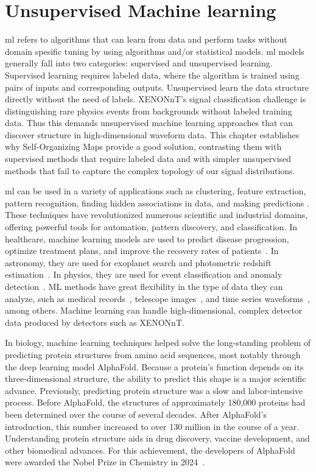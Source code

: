 \section{Unsupervised Machine learning}

\acrfull{ml} refers to algorithms that can learn from data and perform tasks without domain spesific tuning by using algorithms and/or statistical models.
\acrshort{ml} models generally fall into two categories: supervised and unsupervised learning. Supervised learning requires labeled data, where the algorithm is trained using pairs of inputs and corresponding outputs. Unsupervised learn the data structure directly without the need of labels.
XENONnT's signal classification challenge is distinguishing rare physics events from backgrounds without labeled training data. Thus this demands unsupervised machine learning approaches that can discover structure in high-dimensional waveform data. This chapter establishes why Self-Organizing Maps provide a good solution, contrasting them with supervised methods that require labeled data and with simpler unsupervised methods that fail to capture the complex topology of our signal distributions.

\acrshort{ml} can be used in a variety of applications such as clustering, feature extraction, pattern recognition, finding hidden associations in data, and making predictions \cite{Longo_2019}.  These techniques have revolutionized numerous scientific and industrial domains, offering powerful tools for automation, pattern discovery, and classification. In healthcare, machine learning models are used to predict disease progression, optimize treatment plans, and improve the recovery rates of patients~\cite{Dixon2024AIReview}. In astronomy, they are used for exoplanet search and photometric redshift estimation~\cite{CarrascoKind2014SOMz}. In physics, they are used for event classification and anomaly detection~\cite{PhysRevLett.132.081801}. ML methods have great flexibility in the type of data they can analyze, such as medical records~\cite{Blechman2024ML_EHR}, telescope images~\cite{Higson2019BayesianSparse}, and time series waveforms~\cite{Rautio2023WaveformPrediction}, among others. Machine learning can handle high-dimensional, complex detector data produced by detectors such as XENONnT.

In biology, machine learning techniques helped solve the long-standing problem of predicting protein structures from amino acid sequences, most notably through the deep learning model AlphaFold. Because a protein's function depends on its three-dimensional structure, the ability to predict this shape is a major scientific advance. Previously, predicting protein structure was a slow and labor-intensive process. Before AlphaFold, the structures of approximately 180,000 proteins had been determined over the course of several decades. After AlphaFold's introduction, this number increased to over 130 million in the course of a year. Understanding protein structure aids in drug discovery, vaccine development, and other biomedical advances. For this achievement, the developers of AlphaFold were awarded the Nobel Prize in Chemistry in 2024~\cite{Callaway2024ChemistryNobel}.

